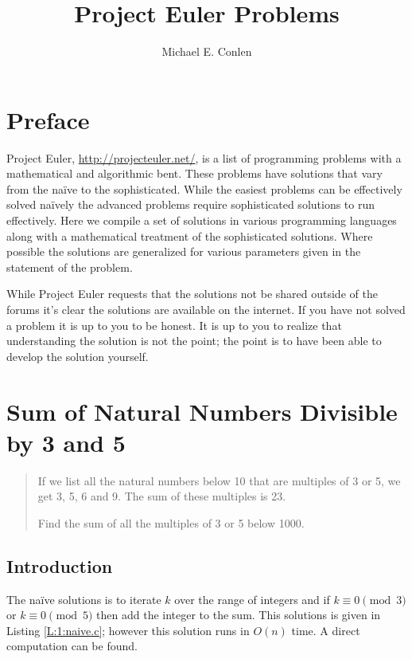 \documentclass[oneside,12pt]{book}   	%
\title{Project Euler Problems}
\author{Michael E. Conlen}
\newcounter{pr}
\theoremstyle{definition}
\begin{document}
\begin{spacing}{1.618}
\frontmatter
\maketitle

\chapter*{Preface}

Project Euler, \url{http://projecteuler.net/}, is a list of programming problems with a mathematical and algorithmic bent. These problems have solutions that vary from the na\"ive to the sophisticated. While the easiest problems can be effectively solved na\"ively the advanced problems require sophisticated solutions to run effectively. Here we compile a set of solutions in various programming languages along with a mathematical treatment of the sophisticated solutions. Where possible the solutions are generalized for various parameters given in the statement of the problem. 

While Project Euler requests that the solutions not be shared outside of the forums it's clear the solutions are available on the internet. If you have not solved a problem it is up to you to be honest. It is up to  you to realize that understanding the solution is not the point; the point is to have been able to develop the solution yourself. 

\tableofcontents
\lstlistoflistings
\mainmatter

	\chapter{Sum of Natural Numbers Divisible by 3 and 5}
			\begin{quote}
				If we list all the natural numbers below 10 that are multiples of 3 or 5, we get 3, 5, 6 and 9. The sum of these multiples is 23.

				Find the sum of all the multiples of 3 or 5 below 1000.
			\end{quote}

		\section{Introduction}
			
			The na\"ive solutions is to iterate $k$ over the range of integers and if $k\equiv 0\pmod 3$ or $k\equiv 0\pmod 5$ then add the integer to the sum. This solutions is given in Listing \ref{L:1:naive.c}; however this solution runs in $O(n)$ time. A direct computation can be found. 



\end{spacing}
\end{document}
